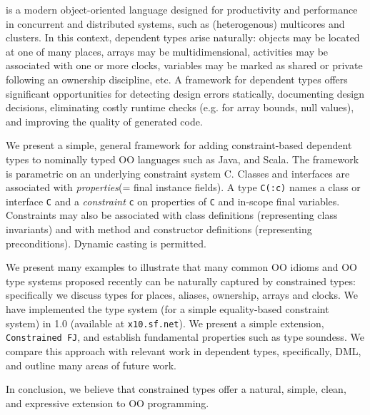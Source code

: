 \Xten{} is a modern object-oriented language designed for productivity
and performance in concurrent and distributed systems, such as
(heterogenous) multicores and clusters. In this context, dependent
types arise naturally: objects may be located at one of many places,
arrays may be multidimensional, activities may be associated with one
or more clocks, variables may be marked as shared or private following
an ownership discipline, etc.  A framework for dependent types offers
significant opportunities for detecting design errors statically,
documenting design decisions, eliminating costly runtime checks
(e.g.{} for array bounds, null values), and improving the quality of
generated code.

We present a simple, general framework for adding constraint-based
dependent types to nominally typed OO languages such as Java, \Xten{}
and Scala. The framework is parametric on an underlying constraint
system {\cal C}. Classes and interfaces are associated with {\em
properties}(= final instance fields). A type {\tt C(:c)} names a class
or interface {\tt C} and a {\em constraint} {\tt c} on
properties of {\tt C} and in-scope final variables.  Constraints
may also be associated with class definitions (representing
class invariants) and with method and constructor definitions
(representing preconditions). Dynamic casting is permitted.

We present many examples to illustrate that many common OO idioms and
OO type systems proposed recently can be naturally captured by
constrained types: specifically we discuss types for places, aliases,
ownership, arrays and clocks. We have implemented the type system (for
a simple equality-based constraint system) in \Xten{} 1.0 (available
at {\tt x10.sf.net}). We present a simple \FJ{} extension, {\tt
Constrained FJ}, and establish fundamental properties such as type
soundess. We compare this approach with relevant work in dependent
types, specifically, DML, and outline many areas of future work.

In conclusion, we believe that constrained types offer a natural,
simple, clean, and expressive extension to OO programming.
